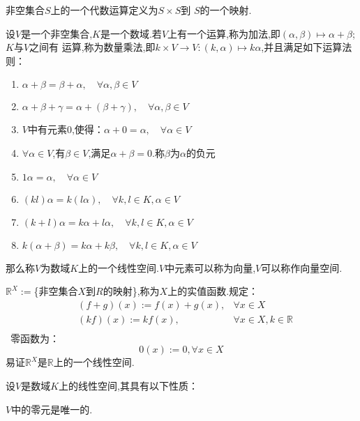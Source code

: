\documentclass[blue,normal,cn]{elegantnote}
\begin{document}
\begin{theorem}
\begin{definition}
   非空集合$S$上的一个代数运算定义为$S\times S$到 $S$的一个映射.
\end{definition}

\begin{definition}
设$V$是一个非空集合,$K$是一个数域.若$V$上有一个运算,称为加法,即$(α,β) \mapsto α + β$;$K$与$V$之间有
运算,称为数量乘法,即$k\times V \rightarrow V:(k,α) \mapsto kα$,并且满足如下运算法则：
    \begin{enumerate}[(1)]
        \item $α+β=β+α,\quad \forall α , β ∈ V $
        \item $α+β+γ=α+(β+γ),\quad \forall α,β ∈ V $
        \item $V$中有元素$0$,使得：$α + 0=α,\quad \forall α ∈ V$
        \item $\forall α ∈ V$,有$β ∈ V$,满足$α+β=0$.称$β$为$α$的负元
        \item $1α=α,\quad \forall α ∈ V$
        \item $(kl)α=k(lα),\quad \forall k,l ∈ K,α ∈ V$
        \item $(k+l)α=kα+lα,\quad \forall k,l ∈ K,α ∈ V$
        \item $k(α+β)=kα+kβ,\quad \forall k,l ∈ K,α ∈ V$
    \end{enumerate}
    那么称$V$为数域$K$上的一个线性空间.$V$中元素可以称为向量,$V$可以称作向量空间.
\end{definition}
\begin{example}
    $\mathbb{R}^X:=$\{非空集合$X$到$R$的映射\},称为$X$上的实值函数.规定：
    \begin{equation*}
        \begin{aligned}
        &(f+g)(x):=f(x)+g(x),&\forall x ∈ X\\
        &(kf)(x):=kf(x), &\forall x ∈ X,k∈ \mathbb{R}\\
        \end{aligned}
    \end{equation*}\
    零函数为：
    \begin{equation*}
        0(x):=0,\forall x ∈ X
    \end{equation*}
    易证$\mathbb{R}^X$是$\mathbb{R}$上的一个线性空间.
\end{example}

设$V$是数域$K$上的线性空间,其具有以下性质：

\begin{property}
    $V$中的零元是唯一的.
\end{property}


\end{theorem}
\end{document}
